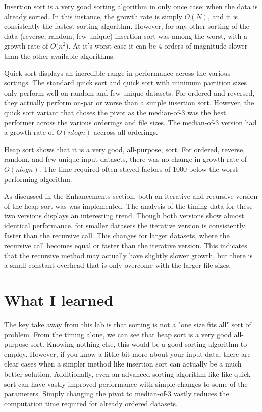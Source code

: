 \documentclass[a4paper,12pt]{article}
\begin{document}
Insertion sort is a very good sorting algorithm in only once case; when the data is already sorted.  In this instance, the growth rate is simply $O(N)$, and it is consistently the fastest sorting algorithm.  However, for any other sorting of the data (reverse, random, few unique) insertion sort was among the worst, with a growth rate of $O(n^2$).  At it's worst case it can be 4 orders of magnitude slower than the other available algorithms.

Quick sort displays an incredible range in performance across the various sortings.  The standard quick sort and quick sort with minimum partition sizes only perform well on random and few unique datasets.  For ordered and reversed, they actually perform on-par or worse than a simple insertion sort.  However, the quick sort variant that choses the pivot as the median-of-3 was the best performer across the various orderings and file sizes.  The median-of-3 version had a growth rate of $O(nlogn)$ accross all orderings.

Heap sort shows that it is a very good, all-purpose, sort.  For ordered, reverse, random, and few unique input datasets, there was no change in growth rate of $O(nlogn)$.  The time required often stayed factors of 1000 below the worst-performing algorithm. 

As discussed in the Enhancements section, both an iterative and recursive version of the heap sort was was implemented.  The analysis of the timing data for these two versions displays an interesting trend.  Though both versions show almost identical performance, for smaller datasets the iterative version is consistently faster than the recursive call.  This changes for larger datasets, where the recursive call becomes equal or faster than the iterative version.  This indicates that the recursive method may actually have slightly slower growth, but there is a small constant overhead that is only overcome with the larger file sizes.



\section{What I learned}
The key take away from this lab is that sorting is not a "one size fits all" sort of problem.  From the timing alone, we can see that heap sort is a very good all-purpose sort.  Knowing nothing else, this would be a good sorting algorithm to employ.  However, if you know a little bit more about your input data, there are clear cases when a simpler method like insertion sort can actually be a much better solution.  Additionally, even an advanced sorting algorithm like like quick sort can have vastly improved performance with simple changes to some of the parameters.  Simply changing the pivot to median-of-3 vastly reduces the computation time required for already ordered datasets.
\end{document}
